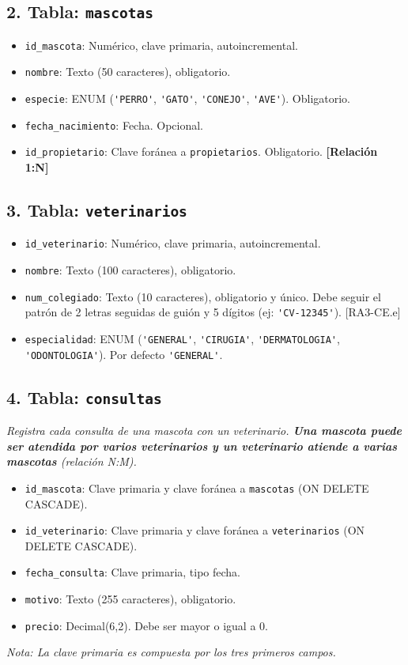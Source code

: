 \documentclass[a4paper,11pt]{article}
\begin{document}
\begin{Form}
\subsection*{2. Tabla: \texttt{mascotas}}
\begin{itemize}
    \item \texttt{id\_mascota}: Numérico, clave primaria, autoincremental.
    \item \texttt{nombre}: Texto (50 caracteres), obligatorio.
    \item \texttt{especie}: ENUM (\lstinline{'PERRO'}, \lstinline{'GATO'}, \lstinline{'CONEJO'}, \lstinline{'AVE'}). Obligatorio.
    \item \texttt{fecha\_nacimiento}: Fecha. Opcional.
    \item \texttt{id\_propietario}: Clave foránea a \texttt{propietarios}. Obligatorio. \textbf{[Relación 1:N]}
\end{itemize}

\subsection*{3. Tabla: \texttt{veterinarios}}
\begin{itemize}
    \item \texttt{id\_veterinario}: Numérico, clave primaria, autoincremental.
    \item \texttt{nombre}: Texto (100 caracteres), obligatorio.
    \item \texttt{num\_colegiado}: Texto (10 caracteres), obligatorio y único. Debe seguir el patrón de 2 letras seguidas de guión y 5 dígitos (ej: \lstinline{'CV-12345'}). [RA3-CE.e]
    \item \texttt{especialidad}: ENUM (\lstinline{'GENERAL'}, \lstinline{'CIRUGIA'}, \lstinline{'DERMATOLOGIA'}, \lstinline{'ODONTOLOGIA'}). Por defecto \lstinline{'GENERAL'}.
\end{itemize}

\subsection*{4. Tabla: \texttt{consultas}}
\textit{Registra cada consulta de una mascota con un veterinario. \textbf{Una mascota puede ser atendida por varios veterinarios y un veterinario atiende a varias mascotas} (relación N:M).}
\begin{itemize}
    \item \texttt{id\_mascota}: Clave primaria y clave foránea a \texttt{mascotas} (ON DELETE CASCADE).
    \item \texttt{id\_veterinario}: Clave primaria y clave foránea a \texttt{veterinarios} (ON DELETE CASCADE).
    \item \texttt{fecha\_consulta}: Clave primaria, tipo fecha.
    \item \texttt{motivo}: Texto (255 caracteres), obligatorio.
    \item \texttt{precio}: Decimal(6,2). Debe ser mayor o igual a 0.
\end{itemize}
\textit{Nota: La clave primaria es compuesta por los tres primeros campos.}


\end{Form}
\end{document}
